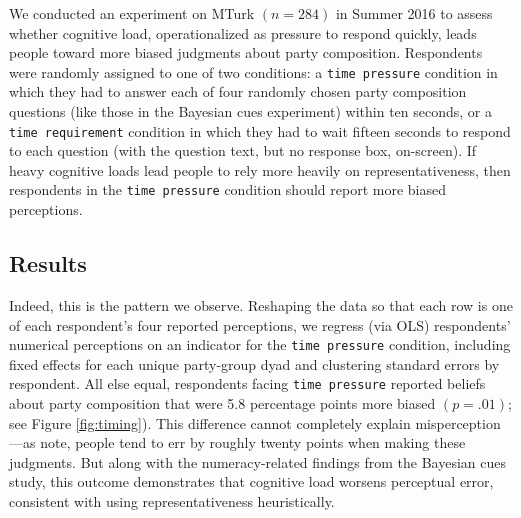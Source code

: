 \documentclass[12pt, letterpaper]{article}
\begin{document}
We conducted an experiment on MTurk $(n=284)$ in Summer 2016 to assess whether cognitive load, operationalized as pressure to respond quickly, leads people toward more biased judgments about party composition. Respondents were randomly assigned to one of two conditions: a {\tt time pressure} condition in which they had to answer each of four randomly chosen party composition questions (like those in the Bayesian cues experiment) within ten seconds, or a {\tt time requirement} condition in which they had to wait fifteen seconds to respond to each question (with the question text, but no response box, on-screen). If heavy cognitive loads lead people to rely more heavily on representativeness, then respondents in the {\tt time pressure} condition should report more biased perceptions.

\subsection{Results}

Indeed, this is the pattern we observe. Reshaping the data so that each row is one of each respondent's four reported perceptions, we regress (via OLS) respondents' numerical perceptions on an indicator for the {\tt time pressure} condition, including fixed effects for each unique party-group dyad and clustering standard errors by respondent. All else equal, respondents facing {\tt time pressure} reported beliefs about party composition that were 5.8 percentage points more biased $(p=.01)$; see Figure \ref{fig:timing}). This difference cannot completely explain misperception---as \citet{ahler2018parties} note, people tend to err by roughly twenty points when making these judgments. But along with the numeracy-related findings from the Bayesian cues study, this outcome demonstrates that cognitive load worsens perceptual error, consistent with using representativeness heuristically.
\end{document}
